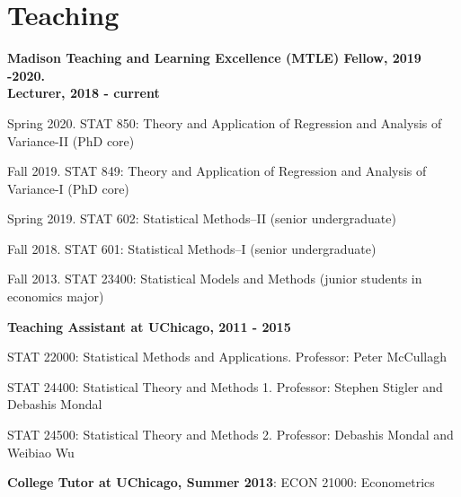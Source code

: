 \documentclass[letterpaper]{article}
\renewenvironment{itemize}{
  \begin{list}{}{
    \setlength{\leftmargin}{1.5em}
  }
}{
  \end{list}
}
\begin{document}
\section*{Teaching}
{\bf Madison Teaching and Learning Excellence (MTLE) Fellow, 2019 -2020.} \\

{\bf Lecturer, 2018 - current}
\begin{itemize}
\item Spring 2020. STAT 850: Theory and Application of Regression and Analysis of Variance-II (PhD core)
\item Fall 2019. STAT 849: Theory and Application of Regression and Analysis of Variance-I (PhD core)
\item Spring 2019. STAT 602: Statistical Methods--II (senior undergraduate)
\item Fall 2018. STAT 601: Statistical Methods--I (senior undergraduate)
\item Fall 2013. STAT 23400: Statistical Models and Methods (junior students in economics major)
\end{itemize}

{\bf Teaching Assistant at UChicago, 2011 - 2015}
\begin{itemize}
\item STAT 22000: Statistical Methods and Applications. Professor: Peter McCullagh
\item STAT 24400: Statistical Theory and Methods 1. Professor: Stephen Stigler and Debashis Mondal 
\item STAT 24500: Statistical Theory and Methods 2. Professor: Debashis Mondal and Weibiao Wu
 \end{itemize}
 {\bf College Tutor at UChicago, Summer 2013}: ECON 21000: Econometrics
\end{document}
